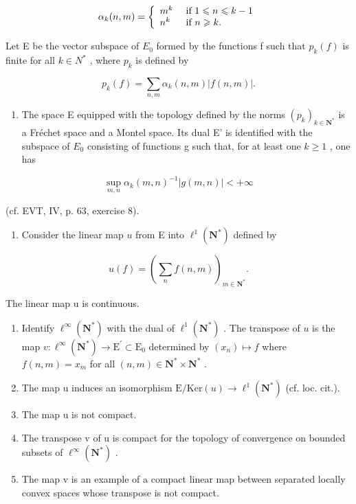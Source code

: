 \[
\alpha_ {k} (n, m) = \left\{ \begin{array}{l l} m ^ {k} & \text { if } 1 \leqslant n \leqslant k - 1 \\ n ^ {k} & \text { if } n \geqslant k. \end{array} \right.
\]

Let E be the vector subspace of \(E_{0}\) formed by the functions f such that \(p_{k}(f)\) is finite for all \(k \in N^{*}\) , where \(p_{k}\) is defined by

\[
p _ {k} (f) = \sum_ {n, m} \alpha_ {k} (n, m) | f (n, m) |.
\]

\begin{enumerate}
\def\labelenumi{\alph{enumi})}
\tightlist
\item
  The space E equipped with the topology defined by the norms \((p_{k})_{k\in\mathbf{N}^{*}}\) is a Fréchet space and a Montel space. Its dual E' is identified with the subspace of \(E_{0}\) consisting of functions g such that, for at least one \(k\geqslant1\) , one has
\end{enumerate}

\[
\sup _ {m, n} \alpha_ {k} (m, n) ^ {- 1} | g (m, n) | <   + \infty
\]

(cf. EVT, IV, p. 63, exercise 8).

\begin{enumerate}
\def\labelenumi{\alph{enumi})}
\setcounter{enumi}{1}
\tightlist
\item
  Consider the linear map \(u\) from E into \(\ell^1 (\mathbf{N}^*)\) defined by
\end{enumerate}

\[
u (f) = \left(\sum_ {n} f (n, m)\right) _ {m \in \mathbf {N} ^ {*}}.
\]

The linear map u is continuous.

\begin{enumerate}
\def\labelenumi{\alph{enumi})}
\setcounter{enumi}{2}
\item
  Identify \(\ell^{\infty}(\mathbf{N}^{*})\) with the dual of \(\ell^{1}(\mathbf{N}^{*})\) . The transpose of \(u\) is the map \(v\colon \ell^{\infty}(\mathbf{N}^{*})\to \mathrm{E}^{\prime}\subset \mathrm{E}_{0}\) determined by \((x_{n})\mapsto f\) where \(f(n,m) = x_{m}\) for all \((n,m)\in \mathbf{N}^{*}\times \mathbf{N}^{*}\) .
\item
  The map u induces an isomorphism \(\mathrm{E}/\mathrm{Ker}(u)\to\ell^{1}(\mathbf{N}^{*})\) (cf. loc. cit.).
\item
  The map u is not compact.
\item
  The transpose v of u is compact for the topology of convergence on bounded subsets of \(\ell^{\infty}(\mathbf{N}^{*})\) .
\item
  The map v is an example of a compact linear map between separated locally convex spaces whose transpose is not compact.
\end{enumerate}

